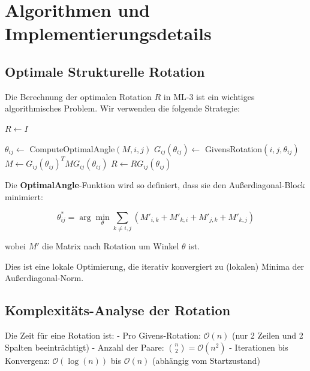 \documentclass[a4paper,12pt]{article}
\theoremstyle{definition}
\begin{document}
\section{Algorithmen und Implementierungsdetails}

\subsection{Optimale Strukturelle Rotation}

Die Berechnung der optimalen Rotation $R$ in ML-3 ist ein wichtiges algorithmisches Problem. Wir verwenden die folgende Strategie:

\begin{algorithm}
\caption{Optimale Strukturelle Rotation (StructuralRotation)}
\label{alg:struct_rotation}
\begin{algorithmic}[1]

\State $R \leftarrow I$ 

		\State $\theta_{ij} \leftarrow$ ComputeOptimalAngle$(M, i, j)$ 
		\State $G_{ij}(\theta_{ij}) \leftarrow$ GivensRotation$(i, j, \theta_{ij})$
		\State $M \leftarrow G_{ij}(\theta_{ij})^T M G_{ij}(\theta_{ij})$
		\State $R \leftarrow R G_{ij}(\theta_{ij})$
	\EndFor
\EndFor

\State {}
\end{algorithmic}
\end{algorithm}

Die \textbf{OptimalAngle}-Funktion wird so definiert, dass sie den Außerdiagonal-Block minimiert:

\[
\theta_{ij}^* = \arg\min_\theta \sum_{k \neq i, j} \left( M'_{i,k} + M'_{k,i} + M'_{j,k} + M'_{k,j} \right)
\]

wobei $M'$ die Matrix nach Rotation um Winkel $\theta$ ist.

Dies ist eine lokale Optimierung, die iterativ konvergiert zu (lokalen) Minima der Außerdiagonal-Norm.

\subsection{Komplexitäts-Analyse der Rotation}

Die Zeit für eine Rotation ist:
- Pro Givens-Rotation: $\mathcal{O}(n)$ (nur 2 Zeilen und 2 Spalten beeinträchtigt)
- Anzahl der Paare: $\binom{n}{2} = \mathcal{O}(n^2)$
- Iterationen bis Konvergenz: $\mathcal{O}(\log(n))$ bis $\mathcal{O}(n)$ (abhängig vom Startzustand)
\end{document}
